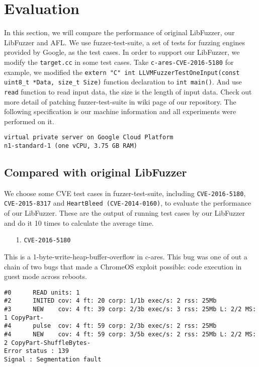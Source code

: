
\section{Evaluation}
\label{sec:eval}

In this section, we will compare the performance of original LibFuzzer, our LibFuzzer and AFL. We use fuzzer-test-suite, a set of tests for fuzzing engines provided by Google, as the test cases. In order to support our LibFuzzer, we modify the \texttt{target.cc} in some test cases. Take \texttt{c-ares-CVE-2016-5180} for example, we modified the \texttt{extern "C" int LLVMFuzzerTestOneInput(const uint8\_t *Data, size\_t Size)} function declaration to \texttt{int main()}. And use \texttt{read} function to read input data, the size is the length of input data. Check out more detail of patching fuzzer-test-suite in wiki page of our repository. The following specification is our machine information and all experiments were performed on it.

\begin{lstlisting}
virtual private server on Google Cloud Platform
n1-standard-1 (one vCPU, 3.75 GB RAM)
\end{lstlisting}

\subsection{Compared with original LibFuzzer}

We choose some CVE test cases in fuzzer-test-suite, including \texttt{CVE-2016-5180}, \texttt{CVE-2015-8317} and \texttt{HeartBleed (CVE-2014-0160)}, to evaluate the performance of our LibFuzzer. These are the output of running test cases by our LibFuzzer and do it 10 times to calculate the average time.

\begin{enumerate}
    \item [1.] \texttt{CVE-2016-5180}
\end{enumerate}

This is a 1-byte-write-heap-buffer-overflow in c-ares. This bug was one of out a chain of two bugs that made a ChromeOS exploit possible: code execution in guest mode across reboots.

\begin{lstlisting}
#0      READ units: 1
#2      INITED cov: 4 ft: 20 corp: 1/1b exec/s: 2 rss: 25Mb
#3      NEW    cov: 4 ft: 39 corp: 2/3b exec/s: 3 rss: 25Mb L: 2/2 MS: 1 CopyPart-
#4      pulse  cov: 4 ft: 59 corp: 2/3b exec/s: 2 rss: 25Mb
#4      NEW    cov: 4 ft: 59 corp: 3/5b exec/s: 2 rss: 25Mb L: 2/2 MS: 2 CopyPart-ShuffleBytes-
Error status : 139
Signal : Segmentation fault
\end{lstlisting}

